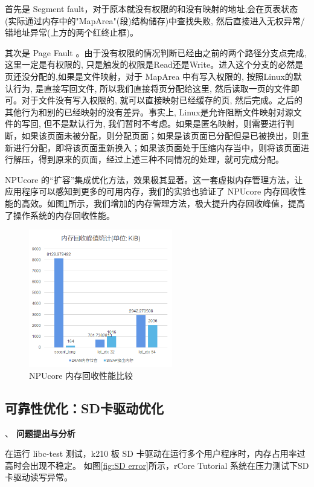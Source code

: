 首先是 Segment fault，对于原本就没有权限的和没有映射的地址,会在页表状态(实际通过内存中的"MapArea"(段)结构储存)中查找失败, 然后直接进入无权异常/错地址异常(上方的两个红终止框)。

其次是 Page Fault 。由于没有权限的情况判断已经由之前的两个路径分支点完成, 这里一定是有权限的, 只是触发的权限是Read还是Write。进入这个分支的必然是页还没分配的,如果是文件映射，对于 MapArea 中有写入权限的, 按照Linux的默认行为, 是直接写回文件, 所以我们直接将页分配给这里, 然后读取一页的文件即可。对于文件没有写入权限的, 就可以直接映射已经缓存的页, 然后完成。之后的其他行为和别的已经映射的没有差异。事实上, Linux是允许阻断文件映射对源文件的写回, 但不是默认行为, 我们暂时不考虑。如果是匿名映射，则需要进行判断，如果该页面未被分配，则分配页面；如果是该页面已分配但是已被换出，则重新进行分配，即将该页面重新换入；如果该页面处于压缩内存当中，则将该页面进行解压，得到原来的页面，经过上述三种不同情况的处理，就可完成分配。

NPUcore 的“扩容”集成优化方法，效果极其显著。这一套虚拟内存管理方法，让应用程序可以感知到更多的可用内存，我们的实验也验证了 NPUcore 内存回收性能的高效。如图\ref{fig:memory test}所示，我们增加的内存管理方法，极大提升内存回收峰值，提高了操作系统的内存回收性能。

\begin{figure}[h]
	\centering
	\includegraphics[width=0.56\textwidth]{figures/10-04-内存实验评估.jpg}
	\caption{NPUcore 内存回收性能比较}
	\label{fig:memory test}
\end{figure}


\subsection{可靠性优化：SD卡驱动优化}
、
\textbf{问题提出与分析}

在运行 libc-test 测试，k210 板 SD 卡驱动在运行多个用户程序时，内存占用率过高时会出现不稳定。 如图\ref{fig:SD error}所示，rCore Tutorial 系统在压力测试下SD卡驱动读写异常。


